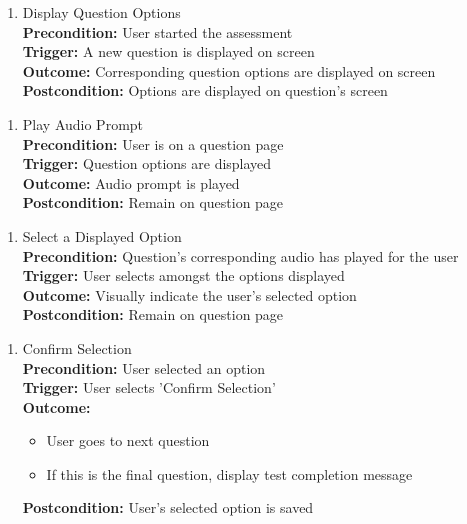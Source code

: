 \documentclass[12pt]{article}
\begin{document}
\begin{enumerate}[label={PUC-}17. ]
  \item Display Question Options\\
  \textbf{Precondition: }User started the assessment\\
  \textbf{Trigger: }A new question is displayed on screen\\
  \textbf{Outcome: }Corresponding question options are displayed on screen\\
  \textbf{Postcondition: }Options are displayed on question's screen\\
\end{enumerate}

\begin{enumerate}[label={PUC-}18. ]
  \item Play Audio Prompt\\
  \textbf{Precondition: }User is on a question page\\
  \textbf{Trigger: }Question options are displayed\\
  \textbf{Outcome: }Audio prompt is played\\
  \textbf{Postcondition: }Remain on question page\\
\end{enumerate}

\begin{enumerate}[label={PUC-}19. ]
  \item Select a Displayed Option\\
  \textbf{Precondition: }Question's corresponding audio has played for the user\\
  \textbf{Trigger: }User selects amongst the options displayed\\
  \textbf{Outcome: }Visually indicate the user's selected option\\
  \textbf{Postcondition: }Remain on question page\\
\end{enumerate}

\begin{enumerate}[label={PUC-}20. ]
  \item Confirm Selection\\
  \textbf{Precondition: }User selected an option\\
  \textbf{Trigger: }User selects 'Confirm Selection'\\
  \textbf{Outcome: }
  \begin{itemize}
    \item User goes to next question
    \item If this is the final question, display test completion message
  \end{itemize}
  \textbf{Postcondition: }User's selected option is saved\\
\end{enumerate}
\end{document}
